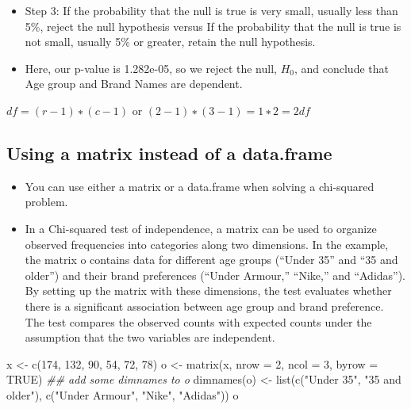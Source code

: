 \documentclass[
  letterpaper,
  DIV=11,
  numbers=noendperiod]{scrreprt}
\newenvironment{Shaded}{\begin{snugshade}}{\end{snugshade}}
\newcommand{\AttributeTok}[1]{\textcolor[rgb]{0.40,0.45,0.13}{#1}}
\newcommand{\ConstantTok}[1]{\textcolor[rgb]{0.56,0.35,0.01}{#1}}
\newcommand{\DecValTok}[1]{\textcolor[rgb]{0.68,0.00,0.00}{#1}}
\newcommand{\DocumentationTok}[1]{\textcolor[rgb]{0.37,0.37,0.37}{\textit{#1}}}
\newcommand{\FunctionTok}[1]{\textcolor[rgb]{0.28,0.35,0.67}{#1}}
\newcommand{\NormalTok}[1]{\textcolor[rgb]{0.00,0.23,0.31}{#1}}
\newcommand{\OtherTok}[1]{\textcolor[rgb]{0.00,0.23,0.31}{#1}}
\newcommand{\StringTok}[1]{\textcolor[rgb]{0.13,0.47,0.30}{#1}}
\providecommand{\tightlist}{%
  \setlength{\itemsep}{0pt}\setlength{\parskip}{0pt}}\usepackage{longtable,booktabs,array}
\begin{document}
\begin{itemize}
\tightlist
\item
  Step 3: If the probability that the null is true is very small,
  usually less than 5\%, reject the null hypothesis versus If the
  probability that the null is true is not small, usually 5\% or
  greater, retain the null hypothesis.
\item
  Here, our p-value is 1.282e-05, so we reject the null, \(H_0\), and
  conclude that Age group and Brand Names are dependent.
\end{itemize}

\(df=(𝑟−1)∗(𝑐−1)\) or \((2−1)∗(3−1)=1∗2= 2df\)

\subsection{Using a matrix instead of a
data.frame}\label{using-a-matrix-instead-of-a-data.frame}

\begin{itemize}
\tightlist
\item
  You can use either a matrix or a data.frame when solving a chi-squared
  problem.
\item
  In a Chi-squared test of independence, a matrix can be used to
  organize observed frequencies into categories along two dimensions. In
  the example, the matrix o contains data for different age groups
  (``Under 35'' and ``35 and older'') and their brand preferences
  (``Under Armour,'' ``Nike,'' and ``Adidas''). By setting up the matrix
  with these dimensions, the test evaluates whether there is a
  significant association between age group and brand preference. The
  test compares the observed counts with expected counts under the
  assumption that the two variables are independent.
\end{itemize}

\begin{Shaded}
\begin{Highlighting}[]
\NormalTok{x }\OtherTok{\textless{}{-}} \FunctionTok{c}\NormalTok{(}\DecValTok{174}\NormalTok{, }\DecValTok{132}\NormalTok{, }\DecValTok{90}\NormalTok{, }\DecValTok{54}\NormalTok{, }\DecValTok{72}\NormalTok{, }\DecValTok{78}\NormalTok{)}
\NormalTok{o }\OtherTok{\textless{}{-}} \FunctionTok{matrix}\NormalTok{(x, }\AttributeTok{nrow =} \DecValTok{2}\NormalTok{, }\AttributeTok{ncol =} \DecValTok{3}\NormalTok{, }\AttributeTok{byrow =} \ConstantTok{TRUE}\NormalTok{)}
\DocumentationTok{\#\# add some dimnames to o}
\FunctionTok{dimnames}\NormalTok{(o) }\OtherTok{\textless{}{-}} \FunctionTok{list}\NormalTok{(}\FunctionTok{c}\NormalTok{(}\StringTok{"Under 35"}\NormalTok{, }\StringTok{"35 and older"}\NormalTok{), }\FunctionTok{c}\NormalTok{(}\StringTok{"Under Armour"}\NormalTok{, }\StringTok{"Nike"}\NormalTok{,}
    \StringTok{"Adidas"}\NormalTok{))}
\NormalTok{o}
\end{Highlighting}
\end{Shaded}
\end{document}
